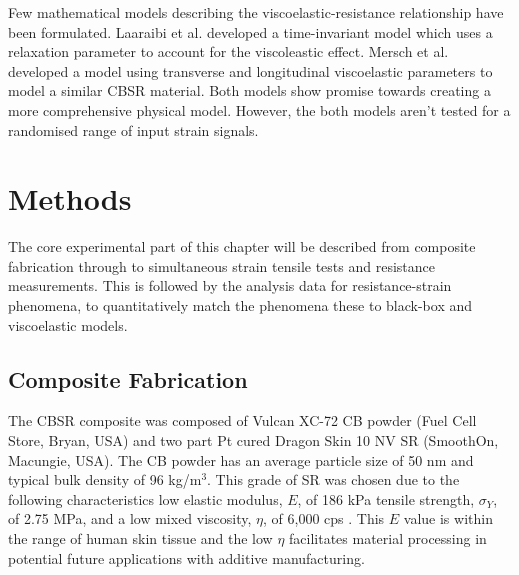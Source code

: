 Few mathematical models describing the viscoelastic-resistance relationship have been formulated. Laaraibi et al. \cite{Laaraibi2023} developed a time-invariant model which uses a relaxation parameter to account for the viscoleastic effect. Mersch et al. \cite{Mersch2020} developed a model using transverse and longitudinal viscoelastic parameters to model a similar CBSR material. Both models show promise towards creating a more comprehensive physical model. However, the both models aren't tested for a randomised range of input strain signals.



\section{Methods}
The core experimental part of this chapter will be described from composite fabrication through to simultaneous strain tensile tests and resistance measurements. This is followed by the analysis data for resistance-strain phenomena, to quantitatively match the phenomena these to black-box and viscoelastic models.


\subsection{Composite Fabrication}
The CBSR composite was composed of Vulcan XC-72 CB powder (Fuel Cell Store, Bryan, USA) and two part Pt cured Dragon Skin 10 NV SR (SmoothOn, Macungie, USA). The CB powder has an average particle size of 50 nm and typical bulk density of 96 kg/m$^3$. This grade of SR was chosen due to the following characteristics low elastic modulus, $E$, of 186 kPa tensile strength, $\sigma_Y$, of 2.75 MPa, and a low mixed viscosity, $\eta$, of 6,000 cps \cite{SmoothOn2021}. This $E$ value is within the range of human skin tissue and the low $\eta$ facilitates material processing in potential future applications with additive manufacturing.

